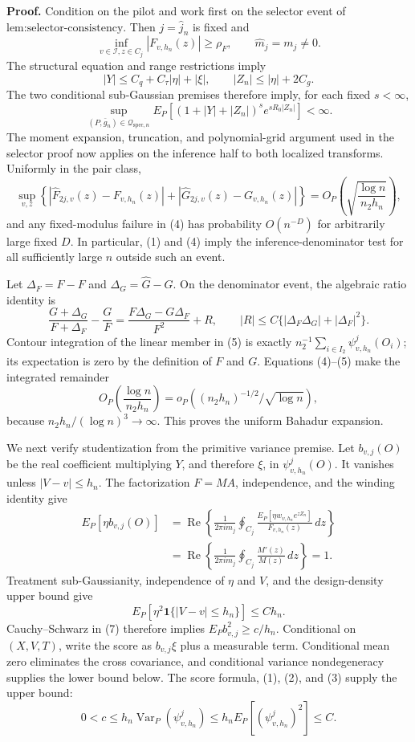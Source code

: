 \textbf{Proof.}
Condition on the pilot and work first on the selector event of \(\text{lem:selector-consistency}\).  Then \(j=\widehat j_n\) is fixed and
\[
 \inf_{v\in\mathcal I,z\in C_j}|F_{v,h_n}(z)|\ge\rho_F,
 \qquad \widehat m_j=m_j\ne0. \tag{1}
\]
The structural equation and range restrictions imply
\[
 |Y|\le C_q+C_\tau|\eta|+|\xi|,
 \qquad |Z_n|\le|\eta|+2C_g. \tag{2}
\]
The two conditional sub-Gaussian premises therefore imply, for each fixed \(s<\infty\),
\[
 \sup_{(P,\bar g_n)\in\mathcal Q_{\mathrm{spec},n}}
 E_P[(1+|Y|+|Z_n|)^se^{sR_0|Z_n|}]<\infty. \tag{3}
\]
The moment expansion, truncation, and polynomial-grid argument used in the selector proof now applies on the inference half to both localized transforms.  Uniformly in the pair class,
\[
 \sup_{v,z}\left\{
 |\widehat F_{2j,v}(z)-F_{v,h_n}(z)|
 +|\widehat G_{2j,v}(z)-G_{v,h_n}(z)|
 \right\}
 =O_P\!\left(\sqrt{\frac{\log n}{n_2h_n}}\right), \tag{4}
\]
and any fixed-modulus failure in (4) has probability \(O(n^{-D})\) for arbitrarily large fixed \(D\).  In particular, (1) and (4) imply the inference-denominator test for all sufficiently large \(n\) outside such an event.

Let \(\Delta_F=\widehat F-F\) and \(\Delta_G=\widehat G-G\).  On the denominator event, the algebraic ratio identity is
\[
 \frac{G+\Delta_G}{F+\Delta_F}-\frac GF
 =\frac{F\Delta_G-G\Delta_F}{F^2}+R,
 \qquad
 |R|\le C\{|\Delta_F\Delta_G|+|\Delta_F|^2\}. \tag{5}
\]
Contour integration of the linear member in (5) is exactly
\(n_2^{-1}\sum_{i\in I_2}\psi^j_{v,h_n}(O_i)\); its expectation is zero by the definition of \(F\) and \(G\).  Equations (4)--(5) make the integrated remainder
\[
 O_P\!\left(\frac{\log n}{n_2h_n}\right)
 =o_P\!\left((n_2h_n)^{-1/2}/\sqrt{\log n}\right), \tag{6}
\]
because \(n_2h_n/(\log n)^3\to\infty\).  This proves the uniform Bahadur expansion.

We next verify studentization from the primitive variance premise.  Let \(b_{v,j}(O)\) be the real coefficient multiplying \(Y\), and therefore \(\xi\), in \(\psi^j_{v,h_n}(O)\).  It vanishes unless \(|V-v|\le h_n\).  The factorization \(F=MA\), independence, and the winding identity give
\[
 \begin{aligned}
 E_P[\eta b_{v,j}(O)]
 &=\operatorname{Re}\left\{
 \frac1{2\pi i m_j}\oint_{C_j}
 \frac{E_P[\eta w_{v,h_n}e^{zZ_n}]}{F_{v,h_n}(z)}\,dz
 \right\}\\
 &=\operatorname{Re}\left\{
 \frac1{2\pi i m_j}\oint_{C_j}\frac{M'(z)}{M(z)}\,dz
 \right\}=1. 
 \end{aligned} \tag{7}
\]
Treatment sub-Gaussianity, independence of \(\eta\) and \(V\), and the design-density upper bound give
\[
 E_P[\eta^2\mathbf 1\{|V-v|\le h_n\}]\le Ch_n.
\]
Cauchy--Schwarz in (7) therefore implies \(E_Pb_{v,j}^2\ge c/h_n\).  Conditional on \((X,V,T)\), write the score as \(b_{v,j}\xi\) plus a measurable term.  Conditional mean zero eliminates the cross covariance, and conditional variance nondegeneracy supplies the lower bound below.  The score formula, (1), (2), and (3) supply the upper bound:
\[
 0<c\le h_n\operatorname{Var}_P(\psi^j_{v,h_n})
 \le h_nE_P[(\psi^j_{v,h_n})^2]\le C. \tag{8}
\]

